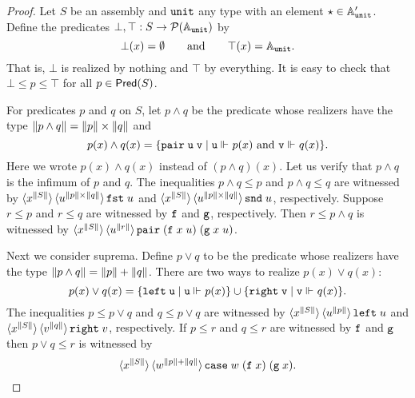 \begin{proof}
  Let $S$ be an assembly and $\mathtt{unit}$ any type with an element
  ${\star} \in \mathbb{A}'_{\mathtt{unit}}$. Define the predicates $\bot, \top :
  S \to \mathcal{P}(\mathbb{A}_{\mathtt{unit}})$ by
  \begin{equation*}
    \bot(x) = \emptyset
    \qquad\text{and}\qquad
    \top(x) = \mathbb{A}_{\mathtt{unit}}.
  \end{equation*}
  That is, $\bot$ is realized by nothing and $\top$ by everything. It is
  easy to check that $\bot \leq p \leq \top$ for all $p \in
  \mathsf{Pred}(S)$.

  For predicates $p$ and $q$ on $S$, let $p \land q$ be the
  predicate whose realizers have the type $\|p \land q\| = \|p\| \times
  \|q\|$ and
  \begin{equation*}
    p(x) \land q(x) = \{\mathtt{pair}\;\mathtt{u}\;\mathtt{v} \mid
    \text{$\mathtt{u} \Vdash_{} p(x)$ and $\mathtt{v} \Vdash_{} q(x)$}\}.
  \end{equation*}
  Here we wrote $p(x) \land q(x)$ instead of $(p \land q)(x)$. Let us
  verify that $p \land q$ is the infimum of $p$ and $q$. The
  inequalities $p \land q \leq p$ and $p \land q \leq q$ are witnessed
  by $\langle x^{\|S\|} \rangle\, \langle u^{\|p\| \times \|q\|} \rangle\,{\mathtt{fst}\;u}$
  and $\langle x^{\|S\|} \rangle\, \langle u^{\|p\| \times
      \|q\|} \rangle\,{\mathtt{snd}\;u}$, respectively. Suppose $r \leq p$ and $r
  \leq q$ are witnessed by $\mathtt{f}$ and $\mathtt{g}$, respectively. Then $r
  \leq p \land q$ is witnessed by $\langle x^{\|S\|} \rangle\,
    \langle u^{\|r\|} \rangle\,{\mathtt{pair}\; (\mathtt{f}\;x\;u)\; (\mathtt{g}\;x\;u)}$.

  Next we consider suprema. Define $p \lor q$ to be the predicate
  whose realizers have the type $\|p \land q\| = \|p\| + \|q\|$. There are
  two ways to realize $p(x) \lor q(x)$:
  \begin{equation*}
    p(x) \lor q(x) =
    \{\mathtt{left}\;\mathtt{u} \mid \mathtt{u} \Vdash_{} p(x)\} \cup
    \{\mathtt{right}\;\mathtt{v} \mid \mathtt{v} \Vdash_{} q(x)\}.
  \end{equation*}
  The inequalities $p \leq p \lor q$ and $q \leq p \lor q$ are
  witnessed by $\langle x^{\|S\|} \rangle\, \langle u^{\|p\|} \rangle\,{\mathtt{left}\;u}$
  and $\langle x^{\|S\|} \rangle\, \langle v^{\|q\|} \rangle\,{\mathtt{right}\;v}$,
  respectively. If $p \leq r$ and $q \leq r$ are witnessed by $\mathtt{f}$
  and $\mathtt{g}$ then $p \lor q \leq r$ is witnessed by
  \begin{equation*}
    \langle x^{\|S\|} \rangle\, \langle w^{\|p\|+\|q\|} \rangle\,{
      \mathtt{case}\;w\;(\mathtt{f}\;x)\;(\mathtt{g}\;x)
    }.
  \end{equation*}
  

\end{proof}
